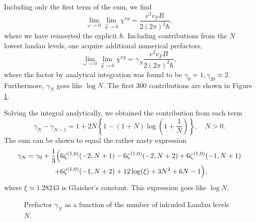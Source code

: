 Including only the first term of the sum, we find
\begin{equation}
  \label{eq:94}
  \lim_{\omega \to 0} \lim_{\vec{q} \to 0} \chi^{xy} = \frac{e^2 v_F B}{2 (2 \pi)^2 \hbar},
\end{equation}
where we have reinserted the explicit \( \hbar \).
Including contributions from the \( N \) lowest landau levels, one acquire additional numerical prefactors,
\begin{equation}
  \label{eq:95}
  \lim_{\omega \to 0} \lim_{\vec{q} \to 0} \chi^{xy} = \gamma_N \frac{e^2 v_F B}{2 (2 \pi)^2 \hbar},
\end{equation}
where the factor by analytical integration was found to be \( \gamma_0 = 1, \gamma_{20} \approx 2 \).
Furthermore, \( \gamma_N \) goes like \( \log N \).
The first 300 contributions are shown in Figure \ref{fig:contributions}.

Solving the integral analytically, we obtained the contribution from each term
\begin{equation}
  \gamma_N - \gamma_{N-1} = 1 + 2 N \left\{1 - (1+N) \log(1 + \frac{1}{N}) \right\} , \quad N > 0.
\end{equation}
The sum can be shown to equal the rather nasty expression
\begin{equation}
  \begin{split}
  \gamma_N = \gamma_0 + \frac{1}{3} &\Big(
    6 \zeta ^{(1,0)}(-2,N+1)
    -6 \zeta ^{(1,0)}(-2,N+2)
    +6 \zeta^{(1,0)}(-1,N+1)\\
    &\hphantom{\Big(} \mathllap{+} 6 \zeta^{(1,0)}(-1,N+2)
    +12 \log (\xi)
    +3 N^2
    +6 N
    -1
  \Big),
  \end{split}
\end{equation}
where \( \xi \approx  1.28243 \) is Glaisher's constant.
This expression goes like \( \log N \).

\begin{figure}[ht]
  \centering
  \newcommand\datafiles{notilt_contrib.csv/}
  \newcommand\plottitle{Numerical prefactor \( \gamma_N \) for untilted system}  %
  \newcommand\prefix{\gamma_N}
  
  \caption{Prefactor \( \gamma_N \) as a function of the number of inlcuded Landau levels~\( N \).}
  \label{fig:contributions}
\end{figure}


